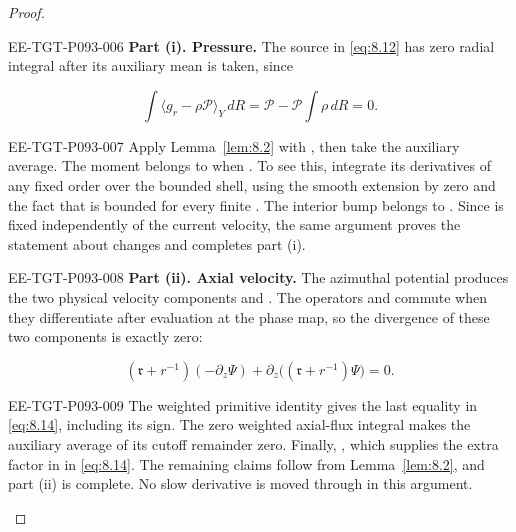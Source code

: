 \begin{proof}
\begin{EESegment}{EE-TGT-P093-006}
\noindent\textbf{Part (i). Pressure.} The source in \eqref{eq:8.12} has zero radial integral after
its auxiliary mean is taken, since
\end{EESegment}
\[
\int\langle g_r-\rho\mathcal P\rangle_Y\,dR
=\mathcal P-\mathcal P\int\rho\,dR=0.
\]
\begin{EESegment}{EE-TGT-P093-007}
Apply Lemma~\ref{lem:8.2} with , then take the auxiliary average. The
moment  belongs to  when
. To see this,
integrate its derivatives of any fixed order over the bounded shell, using the smooth extension by
zero and the fact that  is bounded for every finite
. The interior bump  belongs to
. Since  is fixed independently
of the current velocity, the same argument proves the statement about changes and completes part
(i).
\end{EESegment}

\begin{EESegment}{EE-TGT-P093-008}
\noindent\textbf{Part (ii). Axial velocity.} The azimuthal potential produces the two physical
velocity components  and
. The operators
 and  commute when they
differentiate after evaluation at the phase map, so the divergence of these two components is
exactly zero:
\end{EESegment}
\[
(\mathfrak r+r^{-1})(-\partial_z\Psi)+\partial_z\bigl((\mathfrak r+r^{-1})\Psi\bigr)=0.
\]
\begin{EESegment}{EE-TGT-P093-009}
The weighted primitive identity gives the last equality in \eqref{eq:8.14}, including its sign. The
zero weighted axial-flux integral makes the auxiliary average of its cutoff remainder zero. Finally,
, which supplies the extra factor
 in  in \eqref{eq:8.14}. The
remaining claims follow from Lemma~\ref{lem:8.2}, and part (ii) is complete. No slow derivative is
moved through  in this argument.
\end{EESegment}
\end{proof}

